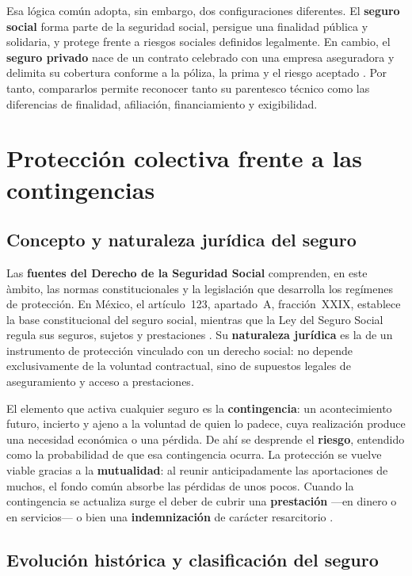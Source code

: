 \documentclass[12pt,letterpaper,oneside]{article}
\begin{document}
Esa l\'ogica com\'un adopta, sin embargo, dos configuraciones diferentes. El \textbf{seguro social} forma parte de la seguridad social, persigue una finalidad p\'ublica y solidaria, y protege frente a riesgos sociales definidos legalmente. En cambio, el \textbf{seguro privado} nace de un contrato celebrado con una empresa aseguradora y delimita su cobertura conforme a la p\'oliza, la prima y el riesgo aceptado \citep{lss2026,leyContratoSeguro2026}. Por tanto, compararlos permite reconocer tanto su parentesco t\'ecnico como las diferencias de finalidad, afiliaci\'on, financiamiento y exigibilidad.

\section{Protecci\'on colectiva frente a las contingencias}

\subsection{Concepto y naturaleza jur\'idica del seguro}

Las \textbf{fuentes del Derecho de la Seguridad Social} comprenden, en este \`ambito, las normas constitucionales y la legislaci\'on que desarrolla los reg\'imenes de protecci\'on. En M\'exico, el art\'iculo~123, apartado~A, fracci\'on~XXIX, establece la base constitucional del seguro social, mientras que la Ley del Seguro Social regula sus seguros, sujetos y prestaciones \citep{lss2026}. Su \textbf{naturaleza jur\'idica} es la de un instrumento de protecci\'on vinculado con un derecho social: no depende exclusivamente de la voluntad contractual, sino de supuestos legales de aseguramiento y acceso a prestaciones.

El elemento que activa cualquier seguro es la \textbf{contingencia}: un acontecimiento futuro, incierto y ajeno a la voluntad de quien lo padece, cuya realizaci\'on produce una necesidad econ\'omica o una p\'erdida. De ah\'i se desprende el \textbf{riesgo}, entendido como la probabilidad de que esa contingencia ocurra. La protecci\'on se vuelve viable gracias a la \textbf{mutualidad}: al reunir anticipadamente las aportaciones de muchos, el fondo com\'un absorbe las p\'erdidas de unos pocos. Cuando la contingencia se actualiza surge el deber de cubrir una \textbf{prestaci\'on} ---en dinero o en servicios--- o bien una \textbf{indemnizaci\'on} de car\'acter resarcitorio \citep{bricenoRuiz2011,leyContratoSeguro2026}.

\subsection{Evoluci\'on hist\'orica y clasificaci\'on del seguro}
\end{document}
